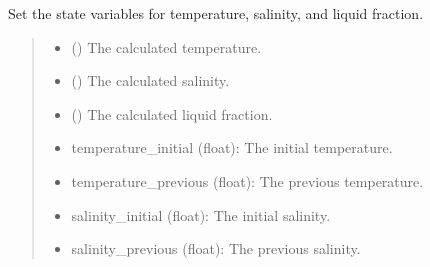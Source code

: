 \documentclass[a4paper,11pt,english,openany]{sphinxmanual}
\begin{document}
\begin{fulllineitems}
\label{\detokenize{api/spyice.statevariables:src.spyice.statevariables.set_statevariables}}
\pysigstartsignatures
\pysiglinewithargsret
{}
{\sphinxparamcomma {}\sphinxparamcomma {}}
{}
\pysigstopsignatures
\sphinxAtStartPar
Set the state variables for temperature, salinity, and liquid fraction.
\begin{quote}\begin{description}
\begin{itemize}
\item {} 
\sphinxAtStartPar
{} () \textendash{} The calculated temperature.

\item {} 
\sphinxAtStartPar
{} () \textendash{} The calculated salinity.

\item {} 
\sphinxAtStartPar
{} () \textendash{} The calculated liquid fraction.

\end{itemize}

\sphinxAtStartPar
\begin{description}
\begin{itemize}
\item {} 
\sphinxAtStartPar
temperature\_initial (float): The initial temperature.

\item {} 
\sphinxAtStartPar
temperature\_previous (float): The previous temperature.

\item {} 
\sphinxAtStartPar
salinity\_initial (float): The initial salinity.

\item {} 
\sphinxAtStartPar
salinity\_previous (float): The previous salinity.


\end{itemize}
\end{description}
\end{description}
\end{quote}
\end{fulllineitems}
\end{document}

